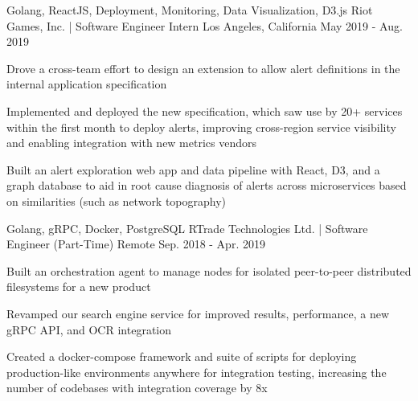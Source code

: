 

\begin{cventries}

\iffalse
  \cventry
    {NodeJS, MongoDB} %
    {Sumus Properties Group Ltd. | Software Developer (Part-Time)} %
    {Remote} %
    {Oct. 2019 - Present} %
    {
      \begin{cvitems} %
        \item {Building data management tooling between databases and API platforms with NodeJS}
      \end{cvitems}
    }
\fi
  \cventry
    {Golang, ReactJS, Deployment, Monitoring, Data Visualization, D3.js} %
    {Riot Games, Inc. | Software Engineer Intern} %
    {Los Angeles, California} %
    {May 2019 - Aug. 2019} %
    {
      \begin{cvitems} %
        \item {Drove a cross-team effort to design an extension to allow alert definitions in the internal application specification}
        \item{Implemented and deployed the new specification, which saw use by 20+ services within the first month to deploy alerts, improving cross-region service visibility and enabling integration with new metrics vendors}
        \item {Built an alert exploration web app and data pipeline with React, D3, and a graph database to aid in root cause diagnosis of alerts across microservices based on similarities (such as network topography)}
      \end{cvitems}
    }

  \cventry
    {Golang, gRPC, Docker, PostgreSQL} %
    {RTrade Technologies Ltd. | Software Engineer (Part-Time)} %
    {Remote} %
    {Sep. 2018 - Apr. 2019} %
    {
      \begin{cvitems} %
        \item {Built an orchestration agent to manage nodes for isolated peer-to-peer distributed filesystems for a new product}
        \item {Revamped our search engine service for improved results, performance, a new gRPC API, and OCR integration}
        \item {Created a docker-compose framework and suite of scripts for deploying production-like environments anywhere for integration testing, increasing the number of codebases with integration coverage by 8x}
      \end{cvitems}
    }


\end{cventries}
